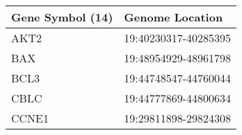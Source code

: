 \begin{tabular}{ll}
\toprule
Gene Symbol (14) &      Genome Location \\
\midrule
            AKT2 & 19:40230317-40285395 \\
             BAX & 19:48954929-48961798 \\
            BCL3 & 19:44748547-44760044 \\
            CBLC & 19:44777869-44800634 \\
           CCNE1 & 19:29811898-29824308 \\
\bottomrule
\end{tabular}
